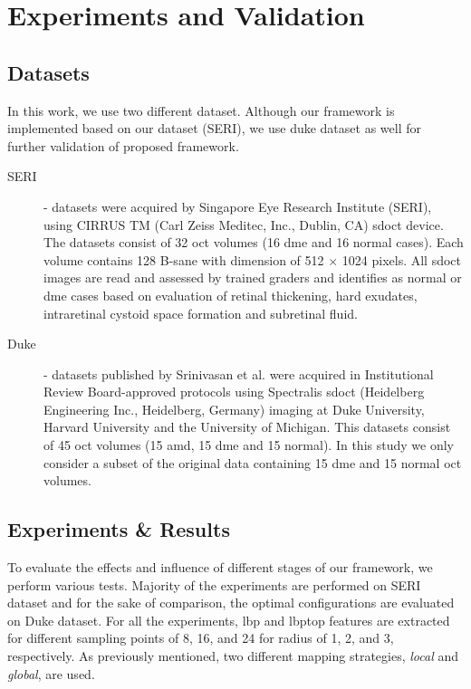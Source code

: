 
\section{Experiments and Validation}\label{sec:exp}

\subsection{Datasets}

In this work, we use two different dataset. 
Although our framework is implemented based on our dataset (SERI), we use duke dataset as well for further validation of proposed framework.
\begin{description}

\item[SERI]- datasets were acquired by Singapore Eye Research Institute (SERI), using CIRRUS TM (Carl Zeiss Meditec, Inc., Dublin, CA) \ac{sdoct} device. The datasets consist of 32 \ac{oct} volumes (16 \ac{dme} and 16 normal cases). Each volume contains 128 B-sane with  dimension of 512 $\times$ 1024 pixels.  All \ac{sdoct} images are read and assessed by trained graders and identifies as normal or \ac{dme} cases based on evaluation of retinal thickening, hard exudates, intraretinal cystoid space formation and subretinal fluid.

\item[Duke] - datasets published by Srinivasan et al. \cite{Srinivasan2014} were acquired in Institutional Review Board-approved protocols using Spectralis \ac{sdoct} (Heidelberg Engineering Inc., Heidelberg, Germany) imaging at Duke University, Harvard University and the University of Michigan. This datasets consist of 45 \ac{oct} volumes (15 \ac{amd}, 15 \ac{dme} and 15 normal). In this study we only consider a subset of the original data containing 15 \ac{dme} and 15 normal \ac{oct} volumes.

\end{description}


\subsection{Experiments \& Results}
To evaluate the effects and influence of different stages of our framework, we perform various tests.
Majority of the experiments are performed on SERI dataset and for the sake of comparison, the optimal configurations are evaluated on Duke dataset.
For all the experiments, \ac{lbp} and \ac{lbptop} features are extracted for different sampling points of 8, 16, and 24 for radius of 1, 2, and 3, respectively.
As previously mentioned, two different mapping strategies, \emph{local} and \emph{global}, are used.

